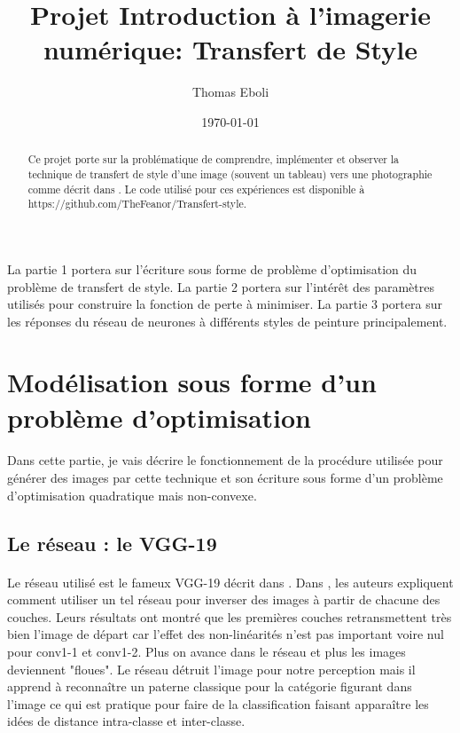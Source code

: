 \documentclass{article}
\author{Thomas Eboli}
\date{\today}
\title{Projet Introduction à l'imagerie numérique: Transfert de Style}
\begin{document}
\maketitle

\begin{abstract}
Ce projet porte sur la problématique de comprendre, implémenter et observer la technique de transfert de style d'une image (souvent un tableau) vers une photographie comme décrit dans \cite{DBLP:journals/corr/GatysEB15a}. Le code utilisé pour ces expériences est disponible à https://github.com/TheFeanor/Transfert-style.
\end{abstract}

\paragraph*{}La partie 1 portera sur l'écriture sous forme de problème d'optimisation du problème de transfert de style. La partie 2 portera sur l'intérêt des paramètres utilisés pour construire la fonction de perte à minimiser. La partie 3 portera sur les réponses du réseau de neurones à différents styles de peinture principalement.

\section{Modélisation sous forme d'un problème d'optimisation}
\paragraph*{}
Dans cette partie, je vais décrire le fonctionnement de la procédure utilisée pour générer des images par cette technique et son écriture sous forme d'un problème d'optimisation quadratique mais non-convexe.

\subsection*{Le réseau : le VGG-19}
\paragraph*{}
Le réseau utilisé est le fameux VGG-19 décrit dans \cite{DBLP:journals/corr/SimonyanZ14a}. Dans \cite{DBLP:journals/corr/MahendranV14}, les auteurs expliquent comment utiliser un tel réseau pour inverser des images à partir de chacune des couches. Leurs résultats ont montré que les premières couches retransmettent très bien l'image de départ car l'effet des non-linéarités n'est pas important voire nul pour conv1-1 et conv1-2. Plus on avance dans le réseau et plus les images deviennent "floues". Le réseau détruit l'image pour notre perception mais il apprend à reconnaître un paterne classique pour la catégorie figurant dans l'image ce qui est pratique pour faire de la classification faisant apparaître les idées de distance intra-classe et inter-classe.
 
\end{document}
